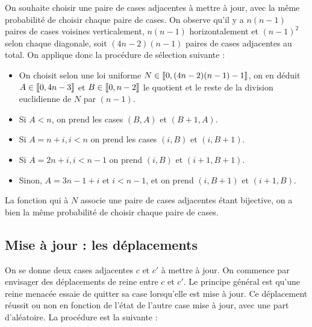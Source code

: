 \documentclass[11pt, openany]{article}
\newcommand{\cg }{[\kern-0.15em [}
\newcommand{\cd}{]\kern-0.15em]}
\begin{document}
On souhaite choisir une paire de cases adjacentes à mettre à jour, avec la même probabilité de choisir chaque paire de cases. On observe qu'il y a $n(n-1)$ paires de cases voisines verticalement, $n(n-1)$ horizontalement et $(n-1)^2$ selon chaque diagonale, soit $(4n-2)(n-1)$ paires de cases adjacentes au total. On applique donc la procédure de sélection suivante : \begin{itemize}

\item{On choisit selon une loi uniforme $N \in \cg 0, (4n-2)(n-1) -1 \cd$, on en déduit $A \in \cg 0, 4n-3 \cd$ et $B \in \cg 0, n-2\cd$ le quotient et le reste de la division euclidienne de $N$ par $(n-1)$.  }
\item{Si $A<n$, on prend les cases $(B,A)$ et $(B+1,A)$.}
\item{Si $A = n+i, i<n$ on prend les cases $(i,B)$ et $(i,B+1)$.}
\item{Si $A = 2n+i,i<n-1$ on prend $(i,B)$ et $(i+1, B+1)$.}
\item{Sinon, $A = 3n-1+i$ et $i<n-1$, et on prend $(i, B+1)$ et $(i+1, B)$.}



\end{itemize}
La fonction qui à $N$ associe une paire de cases adjacentes étant bijective, on a bien la même probabilité de choisir chaque paire de cases. 


\subsection*{Mise à jour : les déplacements}

On se donne deux cases adjacentes $c$ et $c'$ à mettre à jour. On commence par envisager des déplacements de reine entre $c$ et $c'$. Le principe général est qu'une reine menacée essaie de quitter sa case lorsqu'elle est mise à jour. Ce déplacement réussit ou non en fonction de l'état de l'autre case mise à jour, avec une part d'aléatoire. La procédure est la suivante :
\end{document}
